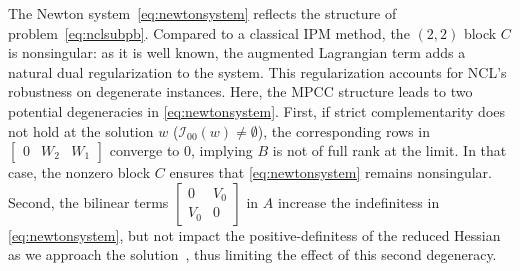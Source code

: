 \documentclass{IEEEtran4PSCC}
\begin{document}
The Newton system~\eqref{eq:newtonsystem} reflects the structure of
problem~\eqref{eq:nclsubpb}. Compared to a classical IPM method, the
$(2,2)$ block $C$ is nonsingular: as it is well known, the augmented Lagrangian
term adds a natural dual regularization to the system. This regularization
accounts for NCL's robustness on degenerate instances.
Here, the MPCC structure leads to two potential degeneracies in \eqref{eq:newtonsystem}.
First, if strict complementarity does not hold
at the solution $w$ ($\mathcal{I}_{00}(w) \neq \emptyset$), the corresponding rows in $\begin{bmatrix}
  0 & W_2 & W_1 \end{bmatrix}$ converge to 0, implying $B$ is not of full rank at the limit.
In that case, the nonzero block $C$ ensures that \eqref{eq:newtonsystem} remains nonsingular.
Second, the bilinear terms $\begin{bmatrix} 0 & V_0 \\ V_0 & 0 \end{bmatrix}$
in $A$ increase the indefinitess in \eqref{eq:newtonsystem},
but not impact the positive-definitess of the reduced Hessian
as we approach the solution~\cite[Section 3.4]{demiguel2005two}, thus limiting
the effect of this second degeneracy.
\end{document}
